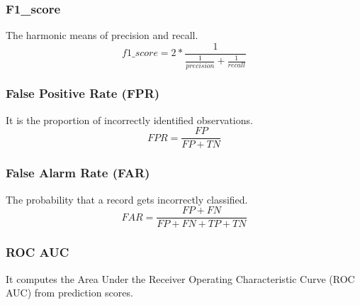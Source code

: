 \documentclass[14pt, conference]{IEEEtran}
\begin{document}
\subsubsection{F1\_score}
The harmonic means of precision and recall.
\begin{equation}
    f1\_score = 2 * \frac{1}{\frac{1}{precision}+ \frac{1}{recall}}
\end{equation}

\subsubsection{False Positive Rate (FPR)}
It is the proportion of incorrectly identified observations.
\begin{equation}
    FPR = \frac{FP}{FP+TN}
\end{equation}

\subsubsection{False Alarm Rate (FAR)}
The probability that a record gets incorrectly classified.
\begin{equation}
    FAR = \frac{FP+FN}{FP+FN+TP+TN}
\end{equation}

\subsubsection{ROC AUC}
It computes the Area Under the Receiver Operating Characteristic Curve (ROC AUC) from prediction scores.


\end{document}
